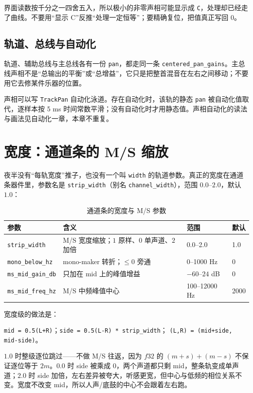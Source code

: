 界面读数按千分之一四舍五入，所以极小的非零声相可能显示成 \texttt{C}，处理却已经走了曲线。不要用“显示 C”反推“处理一定恒等”；要精确复位，把值真正写回 $0$。

\subsection{轨道、总线与自动化}

轨道、辅助总线与主总线各有一份 \texttt{pan}，都走同一条 \texttt{centered\_pan\_gains}。主总线声相不是“总输出的平衡”或“总增益”，它只是把整首混音在左右之间移动；不要用它去修某件乐器的位置。

声相可以写 \texttt{TrackPan} 自动化泳道。存在自动化时，该轨的静态 \texttt{pan} 被自动化值取代，逐样本按 5 ms 时间常数平滑；没有自动化时才用静态值。声相自动化的读法与画法见自动化一章，本章不重复。

\section{宽度：通道条的 M/S 缩放}

夜半没有“每轨宽度”推子，也没有一个叫 \texttt{width} 的轨道参数。真正的宽度在通道条器件里，参数名是 \texttt{strip\_width}（别名 \texttt{channel\_width}），范围 $0.0$–$2.0$，默认 $1.0$：

\begin{table}[htbp]
\centering
\small
\begin{tabular}{@{}llll@{}}
\hline
参数 & 含义 & 范围 & 默认 \\
\hline
\texttt{strip\_width} & M/S 宽度缩放；$1$ 原样、$0$ 单声道、$2$ 加倍 & 0.0–2.0 & 1.0 \\
\texttt{mono\_below\_hz} & mono-maker 转折；$\le0$ 旁通 & 0–1000 Hz & 0 \\
\texttt{ms\_mid\_gain\_db} & 只加在 mid 上的峰值增益 & $-60$–$24$ dB & 0 \\
\texttt{ms\_mid\_freq\_hz} & M/S 中频峰值中心 & 100–12000 Hz & 2000 \\
\hline
\end{tabular}
\caption{通道条的宽度与 M/S 参数}
\label{tab:strip-width-params}
\end{table}

宽度级的做法是：

\begin{center}
\texttt{mid = 0.5(L+R)}；\quad \texttt{side = 0.5(L-R) * strip\_width}；\quad
\texttt{(L,R) = (mid+side, mid-side)}。
\end{center}

$1.0$ 时整级逐位跳过——不做 M/S 往返，因为 $f32$ 的 $(m+s)+(m-s)$ 不保证逐位等于 $2m$。$0.0$ 时 side 被乘成 0，两个声道都只剩 mid，整条轨变成单声道；$2.0$ 时 side 加倍，左右差异被夸大，听感更宽，但中心与低频的相位关系不变。宽度不改变 mid，所以人声/底鼓的中心不会跟着左右跑。

